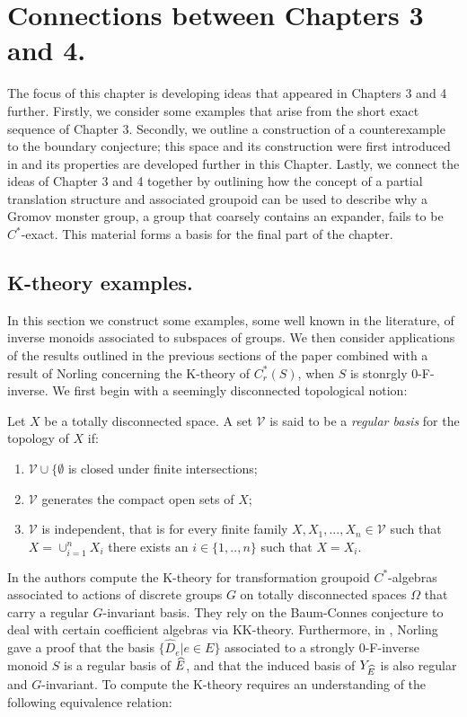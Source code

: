 \chapter{Connections between Chapters 3 and 4.}
The focus of this chapter is developing ideas that appeared in Chapters 3 and 4 further. Firstly, we consider some examples that arise from the short exact sequence of Chapter 3. Secondly, we outline a construction of a counterexample to the boundary conjecture; this space and its construction were first introduced in \cite{MR2363697} and its properties are developed further in this Chapter. Lastly, we connect the ideas of Chapter 3 and 4 together by outlining how the concept of a partial translation structure and associated groupoid can be used to describe why a Gromov monster group, a group that coarsely contains an expander, fails to be $C^{*}$-exact. This material forms a basis for the final part of the chapter.

\section{K-theory examples.}\label{sect:K-theory}

In this section we construct some examples, some well known in the literature, of inverse monoids associated to subspaces of groups. We then consider applications of the results outlined in the previous sections of the paper combined with a result of Norling concerning the K-theory of $C^{*}_{r}(S)$, when $S$ is stonrgly 0-F-inverse. We first begin with a seemingly disconnected topological notion:

\begin{definition}
Let $X$ be a totally disconnected space. A set $\mathcal{V}$ is said to be a \textit{regular basis} for the topology of $X$ if:
\begin{enumerate}
\item $\mathcal{V}\cup \lbrace \emptyset$ is closed under finite intersections; 
\item $\mathcal{V}$ generates the compact open sets of $X$;
\item $\mathcal{V}$ is independent, that is for every finite family $X,X_{1},...,X_{n} \in \mathcal{V}$ such that $X = \cup_{i=1}^{n} X_{i}$ there exists an $i \in \lbrace 1,..,n \rbrace$ such that $X=X_{i}$.
\end{enumerate}
\end{definition}

In \cite{CEL-2} the authors compute the K-theory for transformation groupoid $C^{*}$-algebras associated to actions of discrete groups $G$ on totally disconnected spaces $\Omega$ that carry a regular $G$-invariant basis. They rely on the Baum-Connes conjecture to deal with certain coefficient algebras via KK-theory. Furthermore, in \cite{Nor-2012}, Norling gave a proof that the basis $\lbrace \widehat{D}_{e} | e \in E \rbrace$ associated to a strongly $0$-F-inverse monoid $S$ is a regular basis of $\widehat{E}$, and that the induced basis of $Y_{\widehat{E}}$ is also regular and $G$-invariant. To compute the K-theory requires an understanding of the following equivalence relation:

